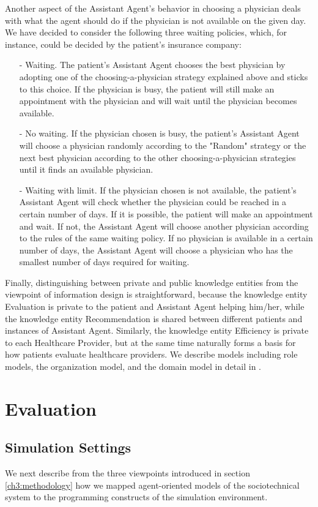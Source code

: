 Another aspect of the Assistant Agent's behavior in choosing a physician deals with what the agent should do if the physician is not available on the given day. We have decided to consider the following three waiting policies, which, for instance, could be decided by the patient's insurance company:
\begin{itemize}
\item[-]Waiting. The patient's Assistant Agent chooses the best physician by adopting one of the choosing-a-physician strategy explained above and sticks to this choice. If the physician is busy, the patient will still make an appointment with the physician and will wait until the physician becomes available.
\item[-]No waiting. If the physician chosen is busy, the patient's Assistant Agent will choose a physician randomly according to the "Random" strategy or the next best physician according to the other choosing-a-physician strategies until it finds an available physician.
\item[-]Waiting with limit. If the physician chosen is not available, the patient's Assistant Agent will check whether the physician could be reached in a certain number of days. If it is possible, the patient will make an appointment and wait. If not, the Assistant Agent will choose another physician according to the rules of the same waiting policy. If no physician is available in a certain number of days, the Assistant Agent will choose a physician who has the smallest number of days required for waiting.
\end{itemize}	
	
Finally, distinguishing between private and public knowledge entities from the viewpoint of information design is straightforward, because the knowledge entity Evaluation is private to the patient and Assistant Agent helping him/her, while the knowledge entity Recommendation is shared between different patients and instances of Assistant Agent. Similarly, the knowledge entity Efficiency is private to each Healthcare Provider, but at the same time naturally forms a basis for how patients evaluate healthcare providers. We describe models including role models, the organization model, and the domain model in detail in \cite{taveter2012}.

\section{Evaluation}
\label{ch3:evaluation}
\subsection{Simulation Settings}
We next describe from the three viewpoints introduced in section \ref{ch3:methodology} how we mapped agent-oriented models of the sociotechnical system to the programming constructs of the simulation environment.


